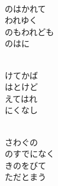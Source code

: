 \documentclass[10pt,b5j]{tarticle} %
\begin{document}
\vspace{1.5em} %
\newcommand{\linespace}{0.5em} %
\newcommand{\blocksize}{0.5\hsize} %
\newcommand{\itemmargin}{3em} %
\begin{enumerate} %
    \setlength{\itemindent}{\itemmargin} %
    \begin{minipage}[c]{\blocksize}
    
        \vspace{\linespace}
        \item~\\
        のはかれて\\
        われゆく\\
        のもわれども\\
        のはに
        
    \end{minipage}
    \begin{minipage}[c]{\blocksize}
        
        \vspace{\linespace}
        \item~\\
        けてかば\\
        はとけど\\
        えてはれ\\
        にくなし
        
    \end{minipage}
    \begin{minipage}[c]{\blocksize}
        
        \vspace{\linespace}
        \item~\\
        さわぐの\\
        のすでになく\\
        きのをびて\\
        ただとまう
        

\end{minipage}
\end{enumerate}
\end{document}
